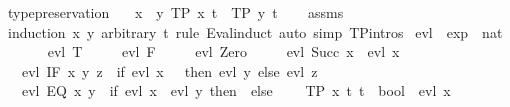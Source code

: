 \begin{isabellebody}
\isanewline
{}\isamarkupfalse%
\ type{\isacharunderscore}{\kern0pt}preservation{\isacharcolon}{\kern0pt}\isanewline
\ \ \ {\isachardoublequoteopen}x\ {\isasymRrightarrow}\ y{\isachardoublequoteclose}\ {\isachardoublequoteopen}TP\ x\ t{\isachardoublequoteclose}\ \ {\isachardoublequoteopen}TP\ y\ t{\isachardoublequoteclose}\isanewline
%
\isadelimproof
\ \ %
\endisadelimproof
%
\isatagproof
{}\isamarkupfalse%
\ assms\isanewline
\ \ \isamarkupfalse%
\ {\isacharparenleft}{\kern0pt}induction\ x\ y\ arbitrary{\isacharcolon}{\kern0pt}\ t\ rule{\isacharcolon}{\kern0pt}\ Eval{\isachardot}{\kern0pt}induct{\isacharparenright}{\kern0pt}\ {\isacharparenleft}{\kern0pt}auto\ simp{\isacharcolon}{\kern0pt}\ TP{\isachardot}{\kern0pt}intros{\isacharparenright}{\kern0pt}%
\endisatagproof
{\isafoldproof}%
%
\isadelimproof
\isanewline
%
\endisadelimproof
\isanewline
{}\isamarkupfalse%
\ evl\ {\isacharcolon}{\kern0pt}{\isacharcolon}{\kern0pt}\ {\isachardoublequoteopen}exp\ {\isasymRightarrow}\ nat{\isachardoublequoteclose}\isanewline
\ \ \isanewline
\ \ \ \ {\isachardoublequoteopen}evl\ T\ {\isacharequal}{\kern0pt}\ {}{\isachardoublequoteclose}\isanewline
\ \ {\isacharbar}{\kern0pt}\ {\isachardoublequoteopen}evl\ F\ {\isacharequal}{\kern0pt}\ {}{\isachardoublequoteclose}\isanewline
\ \ {\isacharbar}{\kern0pt}\ {\isachardoublequoteopen}evl\ Zero\ {\isacharequal}{\kern0pt}\ {}{\isachardoublequoteclose}\isanewline
\ \ {\isacharbar}{\kern0pt}\ {\isachardoublequoteopen}evl\ {\isacharparenleft}{\kern0pt}Succ\ x{\isacharparenright}{\kern0pt}\ {\isacharequal}{\kern0pt}\ evl\ x\ {\isacharplus}{\kern0pt}\ {}{\isachardoublequoteclose}\isanewline
\ \ {\isacharbar}{\kern0pt}\ {\isachardoublequoteopen}evl\ {\isacharparenleft}{\kern0pt}IF\ x\ y\ z{\isacharparenright}{\kern0pt}\ {\isacharequal}{\kern0pt}\ {\isacharparenleft}{\kern0pt}if\ evl\ x\ {\isacharequal}{\kern0pt}\ {}\ then\ evl\ y\ else\ evl\ z{\isacharparenright}{\kern0pt}{\isachardoublequoteclose}\isanewline
\ \ {\isacharbar}{\kern0pt}\ {\isachardoublequoteopen}evl\ {\isacharparenleft}{\kern0pt}EQ\ x\ y{\isacharparenright}{\kern0pt}\ {\isacharequal}{\kern0pt}\ {\isacharparenleft}{\kern0pt}if\ evl\ x\ {\isacharequal}{\kern0pt}\ evl\ y\ then\ {}\ else\ {}{\isacharparenright}{\kern0pt}{\isachardoublequoteclose}\isanewline
\isanewline
{}\isamarkupfalse%
\isanewline
\ \ \ {\isachardoublequoteopen}TP\ x\ t{\isachardoublequoteclose}\ {\isachardoublequoteopen}t\ {\isacharequal}{\kern0pt}\ bool{\isachardoublequoteclose}\ \ {\isachardoublequoteopen}evl\ x\ {\isacharless}{\kern0pt}\ {}{\isachardoublequoteclose}\isanewline

\end{isabellebody}
